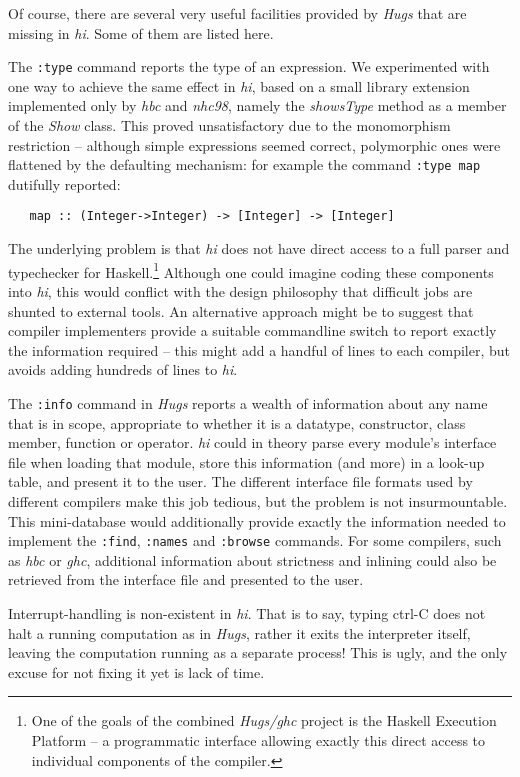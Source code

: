 \documentclass[a4paper]{article}
\begin{document}
Of course, there are several very useful facilities provided by {\em
Hugs} that are missing in {\em hi}.  Some of them are listed here.

The {\tt :type} command reports the type of an expression.
We experimented with one way to achieve the same effect in {\em hi},
based on a small library extension implemented only by {\em hbc}
and {\em nhc98}, namely the {\em showsType} method as a member of the
{\em Show} class.  This proved unsatisfactory due to the monomorphism
restriction -- although simple expressions seemed correct, polymorphic
ones were flattened by the defaulting mechanism: for example the
command {\tt :type map} dutifully reported:

\begin{verbatim}
   map :: (Integer->Integer) -> [Integer] -> [Integer]
\end{verbatim}

The underlying problem is that {\em hi} does not have direct access to
a full parser and typechecker for Haskell.\footnote{One of the goals of
the combined {\em Hugs/ghc} project is the Haskell Execution Platform
-- a programmatic interface allowing exactly this direct access to
individual components of the compiler.}  Although one could imagine
coding these components into {\em hi}, this would conflict with the
design philosophy that difficult jobs are shunted to external tools.
An alternative approach might be to suggest that compiler implementers
provide a suitable commandline switch to report exactly the information
required -- this might add a handful of lines to each compiler,
but avoids adding hundreds of lines to {\em hi}.

The {\tt :info} command in {\em Hugs} reports a wealth of information
about any name that is in scope, appropriate to whether it is a
datatype, constructor, class member, function or operator.  {\em hi}
could in theory parse every module's interface file when loading that
module, store this information (and more) in a look-up table, and
present it to the user.  The different
interface file formats used by different compilers make this job
tedious, but the problem is not insurmountable.  This mini-database
would additionally provide exactly the information needed to implement
the {\tt :find}, {\tt :names} and {\tt :browse} commands.  For some
compilers, such as {\em hbc} or {\em ghc}, additional information
about strictness and inlining could also be retrieved from the interface
file and presented to the user.

Interrupt-handling is non-existent in {\em hi}.  That is to say, typing
ctrl-C does not halt a running computation as in {\em Hugs}, rather
it exits the interpreter itself, leaving the computation running as
a separate process!  This is ugly, and the only excuse for not fixing
it yet is lack of time.
\end{document}

